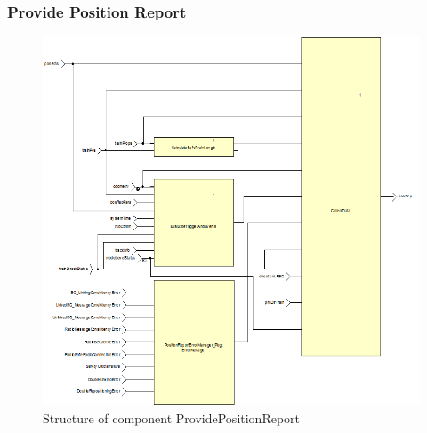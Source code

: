 \subsubsection{Provide Position Report}\label{sss:provposrep}

\begin{figure}[ht]
\centering
\includegraphics[width=\textwidth]{../images/ProvidePositionReport.PNG}
\caption{Structure of component ProvidePositionReport}\label{fig:provideposrep}
\end{figure}


